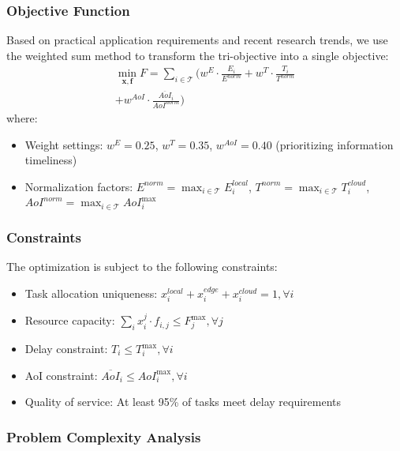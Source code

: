 \documentclass[conference]{IEEEtran}
\begin{document}
\subsubsection{Objective Function}
Based on practical application requirements and recent research trends, we use the weighted sum method to transform the tri-objective into a single objective:
\begin{equation}
    \begin{split}
        \min_{\mathbf{x}, \mathbf{f}} F = \sum_{i \in \mathcal{T}} \bigg( w^E \cdot \frac{E_i}{E^{norm}} + w^T \cdot \frac{T_i}{T^{norm}}
        \\+ w^{AoI} \cdot \frac{\overline{AoI}_i}{AoI^{norm}} \bigg)
    \end{split}
\end{equation}
where:
\begin{itemize}
    \item Weight settings: $w^E = 0.25$, $w^T = 0.35$, $w^{AoI} = 0.40$ (prioritizing information timeliness)
    \item Normalization factors: $E^{norm} = \max_{i \in \mathcal{T}} E_i^{local}$, $T^{norm} = \max_{i \in \mathcal{T}} T_i^{cloud}$, $AoI^{norm} = \max_{i \in \mathcal{T}} AoI_i^{\max}$
\end{itemize}

\subsubsection{Constraints}
The optimization is subject to the following constraints:
\begin{itemize}
    \item[a.] Task allocation uniqueness: $x_{i}^{local} + x_{i}^{edge} + x_{i}^{cloud} = 1, \forall i$
    \item[b.] Resource capacity: $\sum_{i} x_{i}^{j} \cdot f_{i,j} \leq F_{j}^{\max}, \forall j$
    \item[c.] Delay constraint: $T_i \leq T_i^{\max}, \forall i$
    \item[d.] AoI constraint: $\overline{AoI}_i \leq AoI_i^{\max}, \forall i$
    \item[e.] Quality of service: At least 95\% of tasks meet delay requirements
\end{itemize}

\subsubsection{Problem Complexity Analysis}
\end{document}

